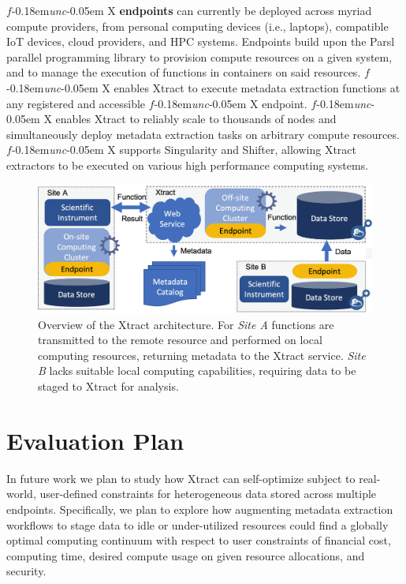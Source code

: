 \documentclass[sigconf, 9pt]{acmart}
\newcommand{\name}{Xtract}
\newcommand{\funcx}{$f$\kern-0.18em\emph{unc}\kern-0.05em X}
\begin{document}
\funcx{} \textbf{endpoints} can currently be deployed across myriad compute providers, from personal computing devices (i.e., laptops), compatible 
IoT devices, cloud providers, and HPC systems.  Endpoints build upon the Parsl~\cite{babuji2019parsl} parallel programming library to 
provision compute resources on a given system, and to manage the execution of functions in containers on said resources. \funcx{} enables 
\name{} to execute metadata extraction functions at any registered and accessible \funcx{} endpoint.  \funcx{} enables \name{} to reliably 
scale to thousands of nodes and simultaneously deploy metadata extraction tasks on arbitrary compute resources. 
\funcx{} supports Singularity and Shifter, allowing \name{} extractors to be executed
on various high performance computing systems. 



\begin{figure}[t]
	\centering
	\includegraphics[scale=0.17]{figs/updated-fig.png}
	\caption{Overview of the \name{} architecture. For \textit{Site A} functions are transmitted to the remote resource and performed on local computing resources, returning metadata to the \name{} service. \textit{Site B} lacks suitable local
	computing capabilities, requiring data to be staged to \name{} for analysis.}
	\label{fig:arch}
\end{figure}


\section{Evaluation Plan}
\label{sec:eval}

In future work we plan to study how \name{} can self-optimize subject to real-world, user-defined constraints for heterogeneous data stored across multiple 
endpoints.  Specifically, we plan to explore how augmenting metadata extraction workflows to stage data to idle or under-utilized resources could 
find a globally optimal computing continuum with respect to user constraints of financial cost, computing time, desired compute usage on 
given resource allocations, and security. 
\end{document}
